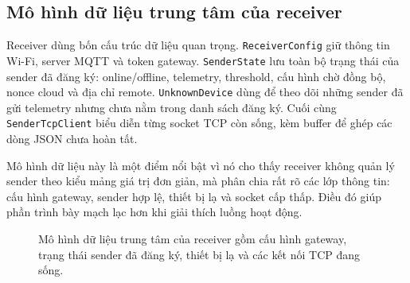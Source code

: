 \documentclass[12pt,a4paper]{report}
\newcommand{\codevar}[1]{{\textcolor{diagramcode}{\texttt{#1}}}}
\newcommand{\codedata}[1]{{\textcolor{diagramdata}{\texttt{#1}}}}
\begin{document}
\subsection{Mô hình dữ liệu trung tâm của receiver}
Receiver dùng bốn cấu trúc dữ liệu quan trọng. \texttt{ReceiverConfig} giữ thông tin Wi-Fi, server MQTT và token gateway. \texttt{SenderState} lưu toàn bộ trạng thái của sender đã đăng ký: online/offline, telemetry, threshold, cấu hình chờ đồng bộ, nonce cloud và địa chỉ remote. \texttt{UnknownDevice} dùng để theo dõi những sender đã gửi telemetry nhưng chưa nằm trong danh sách đăng ký. Cuối cùng \texttt{SenderTcpClient} biểu diễn từng socket TCP còn sống, kèm buffer để ghép các dòng JSON chưa hoàn tất.

Mô hình dữ liệu này là một điểm nổi bật vì nó cho thấy receiver không quản lý sender theo kiểu mảng giá trị đơn giản, mà phân chia rất rõ các lớp thông tin: cấu hình gateway, sender hợp lệ, thiết bị lạ và socket cấp thấp. Điều đó giúp phần trình bày mạch lạc hơn khi giải thích luồng hoạt động.

\begin{figure}[H]
\centering
{}
\caption{Mô hình dữ liệu trung tâm của receiver gồm cấu hình gateway, trạng thái sender đã đăng ký, thiết bị lạ và các kết nối TCP đang sống.}
\label{fig:receiver-data}
\end{figure}
\end{document}
